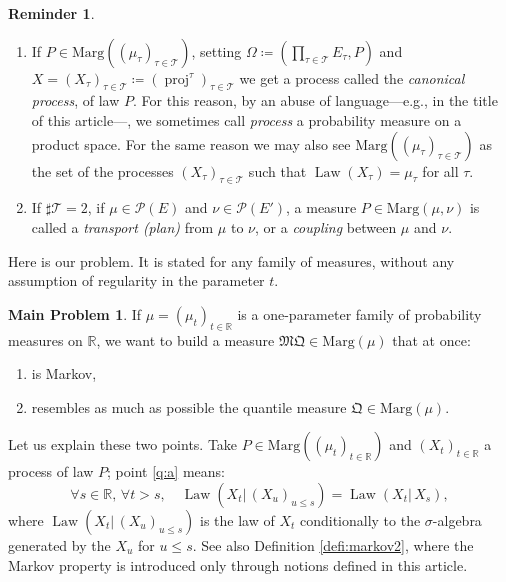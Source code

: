 \documentclass[JEP,XML,SOM,Unicode,NoEqCountersInSection,NoFloatCountersInSection,published]{cedram}
\theoremstyle{plain}
\theoremstyle{definition}
\newtheorem{reminder}[them]{Reminder}
\newtheorem*{problem*}{Main Problem}
\newcommand{\como}{\mathfrak{Q}}
\newcommand{\mq}{\mathfrak{MQ}}
\newcommand{\espace}{E}
\newcommand{\Tt}{{\mathcal T}}
\newcommand{\eqdef}{\coloneqq}
\newcommand{\eqdefup}{\coloneqq}
\newcommand{\p}{\mathcal{P}}
\newcommand{\ma}{\mathrm{Marg}}
\newcommand{\R}{\mathbb{R}}
\newcommand{\law}{\operatorname{Law}}
\newcommand{\pr}{\operatorname{proj}}
\begin{document}
\skpt
\begin{reminder}\label{remind:processus_canonique}
\begin{enumerate}
\item
\label{item:processus_canonique} If $P\in\ma((\mu_\tau)_{\tau\in\Tt})$, setting $\Omega\eqdefup(\prod_{\tau\in\Tt}E_\tau,P)$ and $X=(X_\tau)_{\tau\in \Tt}\eqdef(\pr^\tau)_{\tau\in \Tt}$ we get a process called the \emph{canonical process}, of law $P$. For this reason, by an abuse of language---e.g., in the title of this article---, we sometimes call \emph{process} a probability measure on a product space. For the same reason we may also see $\ma((\mu_\tau)_{\tau\in\Tt})$ as the set of the processes $(X_\tau)_{\tau\in\Tt}$ such that $\law(X_\tau)=\mu_\tau$ for all $\tau$.

\item
If $\sharp{\mathcal T}=2$, \ie if $\mu\in\p(\espace)$ and $\nu\in\p(\espace')$, a measure $P\in\ma(\mu,\nu)$ is called a \emph{transport (plan)} from $\mu$ to $\nu$, or a \emph{coupling} between $\mu$ and $\nu$.
\end{enumerate}
\end{reminder}

Here is our problem. It is stated for any family of measures, without any assumption of regularity in the parameter $t$.

\begin{problem*}\label{problem} If $\mu=(\mu_t)_{t\in\R}$ is a one-parameter family of probability measures on $\R$, we want to build a measure $\mq\in\ma(\mu)$ that at once:
\begin{enumerate}
\item\label{q:a}
is Markov,
\item\label{q:b}
resembles as much as possible the quantile measure $\como\in\ma(\mu)$.
\end{enumerate}
\end{problem*}

Let us explain these two points. Take $P\in\ma((\mu_t)_{t\in\R})$ and $(X_{t})_{t\in\R}$ a process of law $P$; point \eqref{q:a} means:
\begin{equation}\label{eq:def_markovien}
\forall s\in\R,\,\forall t>s,\quad \law(X_t|\,(X_{u})_{u\leqslant s})=\law(X_t|\,X_s),
\end{equation}
where $\law(X_t|\,(X_u)_{u\leq s})$ is the law of $X_t$ conditionally to the $\sigma$-algebra generated by the $X_u$ for $u\leq s$. See also Definition \ref{defi:markov2}, where the Markov property is introduced only through notions defined in this article.
\end{document}
